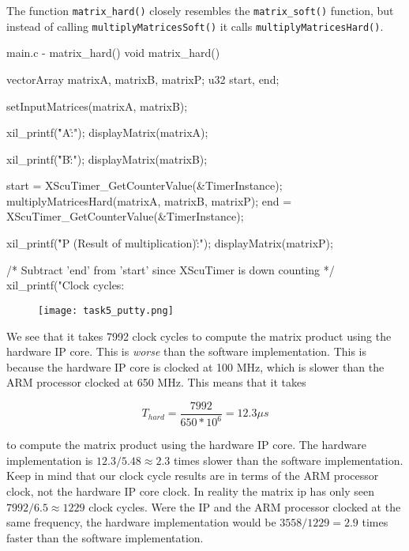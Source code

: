 \documentclass[../main.tex]{subfiles}
\begin{document}
\newpage

The function \texttt{matrix\_hard()} closely resembles the \texttt{matrix\_soft()} function, but instead of calling \texttt{multiplyMatricesSoft()} it calls \texttt{multiplyMatricesHard()}.

\begin{myminted}{main.c - matrix\_hard()}
void matrix_hard()
{
	vectorArray matrixA, matrixB, matrixP;
	u32 start, end;

	setInputMatrices(matrixA, matrixB);

	xil_printf("\r\n\nMatrix A:\r\n");
	displayMatrix(matrixA);

	xil_printf("\r\n\nMatrix B:\r\n");
	displayMatrix(matrixB);

	start = XScuTimer_GetCounterValue(&TimerInstance);
	multiplyMatricesHard(matrixA, matrixB, matrixP);
	end = XScuTimer_GetCounterValue(&TimerInstance);

	xil_printf("\r\n\nMatrix P (Result of multiplication):\r\n");
	displayMatrix(matrixP);

	/* Subtract 'end' from 'start' since XScuTimer is down counting */
	xil_printf("Clock cycles: %
}
\end{myminted}

\begin{figure}[h]
    \centering
    \texttt{[image: task5\_putty.png]}
\end{figure}

\newpage

We see that it takes 7992 clock cycles to compute the matrix product using the hardware IP core. This is \textit{worse} than the software implementation. This is because the hardware IP core is clocked at 100 MHz, which is slower than the ARM processor clocked at 650 MHz. This means that it takes

$$ T_{hard} = \frac{7992}{650 * 10^6} = 12.3 \mu s $$

to compute the matrix product using the hardware IP core. The hardware implementation is $12.3/5.48 \approx 2.3$ times slower than the software implementation. Keep in mind that our clock cycle results are in terms of the ARM processor clock, not the hardware IP core clock. In reality the matrix ip has only seen $7992/6.5 \approx 1229$ clock cycles. Were the IP and the ARM processor clocked at the same frequency, the hardware implementation would be $3558/1229 = 2.9$ times faster than the software implementation.
\end{document}
